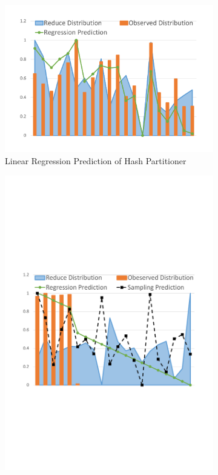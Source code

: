 \documentclass[10pt,twocolumn]{article}
\begin{document}
\begin{figure}
	\centering
	\begin{subfigure}[b]{0.32\linewidth}
		\includegraphics[width=\linewidth]{fig/hash_pre}
		\caption{Linear Regression Prediction of Hash Partitioner}
		\label{fig:hash_pre}
	\end{subfigure}
	\begin{subfigure}[b]{0.32\linewidth}
		\includegraphics[width=\linewidth]{fig/range_pre_sample}

\end{subfigure}
\end{figure}
\end{document}
